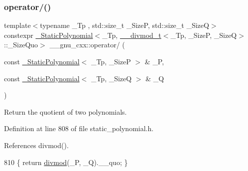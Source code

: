 \subsubsection{\texorpdfstring{operator/()}{operator/()}\hspace{0.1cm}{\footnotesize\ttfamily [2/5]}}
{\footnotesize\ttfamily template$<$typename \+\_\+\+Tp , std\+::size\+\_\+t \+\_\+\+SizeP, std\+::size\+\_\+t \+\_\+\+SizeQ$>$ \\
constexpr \hyperlink{class____gnu__cxx_1_1__StaticPolynomial}{\+\_\+\+Static\+Polynomial}$<$\+\_\+\+Tp, \hyperlink{struct____gnu__cxx_1_1____divmod__t}{\+\_\+\+\_\+divmod\+\_\+t}$<$\+\_\+\+Tp, \+\_\+\+SizeP, \+\_\+\+SizeQ$>$\+::\+\_\+\+Size\+Quo$>$ \+\_\+\+\_\+gnu\+\_\+cxx\+::operator/ (\begin{DoxyParamCaption}\item[{const \hyperlink{class____gnu__cxx_1_1__StaticPolynomial}{\+\_\+\+Static\+Polynomial}$<$ \+\_\+\+Tp, \+\_\+\+SizeP $>$ \&}]{\+\_\+P,  }\item[{const \hyperlink{class____gnu__cxx_1_1__StaticPolynomial}{\+\_\+\+Static\+Polynomial}$<$ \+\_\+\+Tp, \+\_\+\+SizeQ $>$ \&}]{\+\_\+Q }\end{DoxyParamCaption})\hspace{0.3cm}{\ttfamily [inline]}}

Return the quotient of two polynomials. 

Definition at line 808 of file static\+\_\+polynomial.\+h.



References divmod().


\begin{DoxyCode}
810     \{ \textcolor{keywordflow}{return} \hyperlink{namespace____gnu__cxx_a33c585ec7ce2ac87e7f5cb1b1fe403b1}{divmod}(\_P, \_Q).\_\_quo; \}
\end{DoxyCode}
\mbox{\label{namespace____gnu__cxx_a5fd356349013bd60a41010cbf502444b}} 
